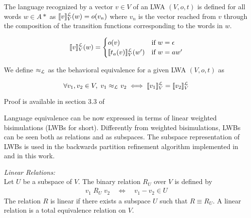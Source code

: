 \begin{defn}
  The language recognized by a vector $v \in V$ of an LWA $(V,o,t)$ is defined
  for all words $w \in A*$ as $\llbracket v\rrbracket^\mathcal{L}_{V}(w) = o(v_n)$ where $v_n$ is the 
  vector reached from $v$ through the composition of the transition functions
  corresponding to the words in $w$.
  
  \begin{equation*}
    \begin{aligned}
      \llbracket v\rrbracket^\mathcal{L}_{V}(w) = \begin{cases}
        o(v) & \text{if } w = \epsilon \\ 
        \llbracket t_a(v)\rrbracket^\mathcal{L}_{V}(w') & \text{if } w = aw' 
      \end{cases}
    \end{aligned}
  \end{equation*}
  
\end{defn}


We define $\approx_{\mathcal{L}}$ as the behavioral equivalence for a given LWA $(V, o, t)$ as 

\begin{equation}
  \forall v_1, v_2 \in V, \; v_1 \approx_{\mathcal{L}} v_2 \iff \llbracket v_1\rrbracket^\mathcal{L}_{V} = \llbracket v_2\rrbracket^\mathcal{L}_{V}
\end{equation}



Proof is available in section 3.3 of \cite{BONCHI201277}

Language equivalence can be now expressed in terms of linear weighted 
bisimulations (LWBs for short).
Differently from weighted bisimulations, LWBs can be seen both as relations 
and as subspaces.
The subspace representation of LWBs is used in the backwards partition 
refinement algorithm 
implemented in \cite{BONCHI201277} and in this work.

\begin{defn}
  \textit{Linear Relations:}\\
  Let $U$ be a subspace of $V$. The binary relation $R_U$ over $V$ is defined by
  \begin{equation*}
    \begin{aligned}
      v_1 \; R_U \; v_2 \quad \iff \quad v_1 - v_2 \in U
    \end{aligned}
  \end{equation*}
  The relation $R$ is linear if there exists a subspace $U$ such that $R \equiv R_U$.
  A linear relation is a total equivalence relation on $V$.
\end{defn}

